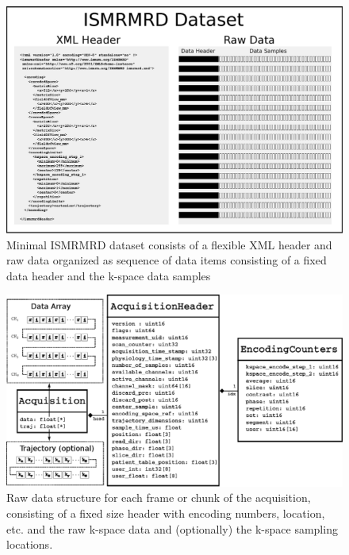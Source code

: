 \documentclass[12pt]{article}
\begin{document}
\begin{figure}
\begin{center}
\includegraphics[width=6in]{figure1_ismrmrd_format.eps}
\caption{Minimal ISMRMRD dataset consists of a flexible XML header and raw data organized as sequence of data items consisting of a fixed data header and the k-space data samples}
\label{fig:format}
\end{center}
\end{figure}

\begin{figure}
\begin{center}
\includegraphics[width=6in]{figure2_uml_diagram.eps}
\caption{Raw data structure for each frame or chunk of the acquisition, consisting of a fixed size header with encoding numbers, location, etc. and the raw k-space data and (optionally) the k-space sampling locations.}
\label{fig:cstruct}
\end{center}
\end{figure}
\end{document}
